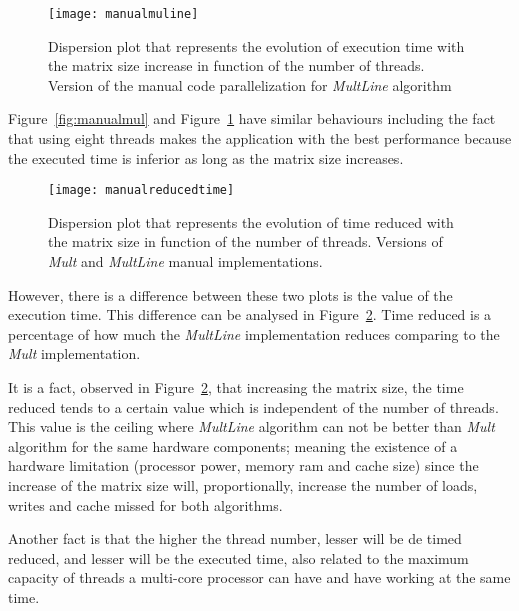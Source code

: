 \begin{figure}[htb]
	\begin{center}
		\leavevmode
		\texttt{[image: manualmuline]}
		\caption{Dispersion plot that represents the evolution of execution time with the matrix size increase in function of the number of threads. Version of the manual code parallelization for \textsl{MultLine} algorithm}
		\label{fig:manualmuline}
	\end{center}
\end{figure}

Figure~\ref{fig:manualmul} and Figure~\ref{fig:manualmuline} have similar behaviours including the fact that using eight threads makes the application with the best performance because the executed time is inferior as long as the matrix size increases.

\begin{figure}[htb]
	\begin{center}
		\leavevmode
		\texttt{[image: manualreducedtime]}
		\caption{Dispersion plot that represents the evolution of time reduced with the matrix size in function of the number of threads. Versions of \textit{Mult} and \textit{MultLine} manual implementations. }
		\label{fig:manualreducedtime}
	\end{center}
\end{figure}

However, there is a difference between these two plots is the value of the execution time. This difference can be analysed in Figure~\ref{fig:manualreducedtime}. Time reduced is a percentage of how much the \textit{MultLine} implementation reduces comparing to the \textit{Mult} implementation. 

It is a fact, observed in Figure~\ref{fig:manualreducedtime}, that increasing the matrix size, the time reduced tends to a certain value which is independent of the number of threads. This value is the ceiling where \textit{MultLine} algorithm can not be better than \textit{Mult} algorithm for the same hardware components; meaning the existence of a hardware limitation (processor power, memory ram and cache size) since the increase of the matrix size will, proportionally, increase the number of loads, writes and cache missed for both algorithms.

Another fact is that the higher the thread number, lesser will be de timed reduced, and lesser will be the executed time, also related to the maximum capacity of threads a multi-core processor can have and have working at the same time.

